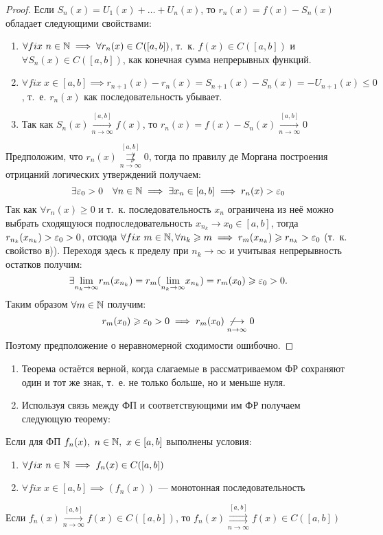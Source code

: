 \documentclass[../../main.tex]{subfiles}
\begin{document}
\begin{proof}
Если $S_n(x) = U_1(x) + \ldots + U_n(x)$, то $r_n(x) = f(x) - S_n(x)$ обладает
следующими свойствами:
	\begin{enumerate}
		\item $\forall fix \ n \in \mathbb{N} \implies 
	\forall r_n(x) \in C([a,b])$, т.~к. $f(x) \in C([a,b])$ и
	$\forall S_n(x) \in C([a,b])$, как конечная сумма непрерывных функций.
		\item $\forall fix \ x \in [a,b] \implies 
	r_{n+1}(x) - r_n(x) = S_{n+1}(x) - S_n(x) = -U_{n+1}(x) \leq 0$, т.~е.
	$r_n(x)$ как последовательность убывает.
		\item Так как $S_n(x) \overset{[a,b]}
	{\underset{n \to \infty}\longrightarrow} f(x)$, то 
	$r_n(x) = f(x) - S_n(x) \overset{[a,b]}
	{\underset{n \to \infty}\longrightarrow} 0$
	\end{enumerate}
Предположим, что $r_n(x) \overset{[a,b]}
{\underset{n \to \infty}{\not \rightrightarrows}} 0$, тогда по правилу
де Моргана построения отрицаний логических утверждений получаем: 
\[
\exists \varepsilon_0 > 0 \quad \forall n \in \mathbb{N} \implies 
\exists x_n \in [a,b] \implies r_n(x) > \varepsilon_0
\]
Так как $\forall r_n(x) \geq 0$ и т.~к. последовательность $x_n$ ограничена
из неё можно выбрать сходящуюся подпоследовательность 
$x_{n_k} \to x_0 \in [a,b]$, тогда $r_{n_k}(x_{n_k}) > \varepsilon_0 > 0$, отсюда
$\forall fix \ m \in \mathbb{N}, \forall n_k \geqslant m \implies r_m(x_{n_k}) \geqslant
r_{n_k} > \varepsilon_0$ (т.~к. свойство в)). Переходя здесь к пределу при 
$n_k \to \infty$ и учитывая непрерывность остатков получим:
\[
\exists \underset{n_k \to \infty}{\lim} r_m(x_{n_k}) = 
r_m(\underset{n_k \to \infty}{\lim}x_{n_k}) = r_m(x_0) \geqslant
\varepsilon_0 > 0.
\]
Таким образом $\forall m \in \mathbb{N}$ получим: 
\[
r_m(x_0) \geqslant \varepsilon_0 > 0 \implies
r_m(x_0) \underset{n \to \infty}{\not \longrightarrow} 0
\]
Поэтому предположение о неравномерной сходимости ошибочно.
\end{proof}

\begin{rem}
	\begin{enumerate}
		\item Теорема остаётся верной, когда слагаемые в рассматриваемом ФР
	сохраняют один и тот же знак, т.~е. не только больше, но и меньше нуля.
		\item Используя связь между ФП и соответствующими им ФР получаем
	следующую теорему:
	\end{enumerate}
\end{rem}	
\begin{thm}
Если для ФП $f_n(x),\ n \in \mathbb{N},\ x \in [a,b]$ выполнены условия:
	\begin{enumerate}
		\item $\forall fix \ n \in \mathbb{N} \implies
		f_n(x) \in C([a,b])$
		\item $\forall fix \ x \in [a,b] \implies
		(f_n(x))$ --- монотонная последовательность 
	\end{enumerate}			
Если $f_n(x) \overset{[a,b]}
{\underset{n \to \infty}\longrightarrow} f(x) \in C([a,b])$, то
$f_n(x) \overset{[a,b]}
{\underset{n \to \infty}\rightrightarrows} f(x) \in C([a,b])$
\end{thm}  
\end{document}
